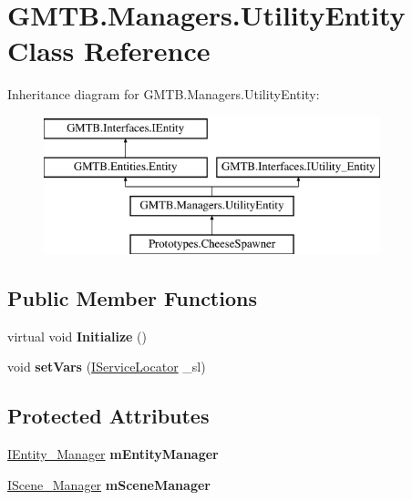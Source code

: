 \hypertarget{class_g_m_t_b_1_1_managers_1_1_utility_entity}{}\section{G\+M\+T\+B.\+Managers.\+Utility\+Entity Class Reference}
\label{class_g_m_t_b_1_1_managers_1_1_utility_entity}
Inheritance diagram for G\+M\+T\+B.\+Managers.\+Utility\+Entity\+:\begin{figure}[H]
\begin{center}
\leavevmode
\includegraphics[height=4.000000cm]{class_g_m_t_b_1_1_managers_1_1_utility_entity}
\end{center}
\end{figure}
\subsection*{Public Member Functions}
\begin{DoxyCompactItemize}
\item 
\mbox{\label{class_g_m_t_b_1_1_managers_1_1_utility_entity_a52030f5969f4c792c0757918839c4547}} 
virtual void {\bfseries Initialize} ()
\item 
\mbox{\label{class_g_m_t_b_1_1_managers_1_1_utility_entity_ad6409146d4f5bd0747c29d7abd35208c}} 
void {\bfseries set\+Vars} (\mbox{\hyperlink{interface_g_m_t_b_1_1_interfaces_1_1_i_service_locator}{I\+Service\+Locator}} \+\_\+sl)
\end{DoxyCompactItemize}
\subsection*{Protected Attributes}
\begin{DoxyCompactItemize}
\item 
\mbox{\label{class_g_m_t_b_1_1_managers_1_1_utility_entity_abd8774c96806a1d37692d5710c28cccf}} 
\mbox{\hyperlink{interface_g_m_t_b_1_1_interfaces_1_1_i_entity___manager}{I\+Entity\+\_\+\+Manager}} {\bfseries m\+Entity\+Manager}
\item 
\mbox{\label{class_g_m_t_b_1_1_managers_1_1_utility_entity_a5c39d9f03ac9d429d6bee7e20efaa421}} 
\mbox{\hyperlink{interface_g_m_t_b_1_1_interfaces_1_1_i_scene___manager}{I\+Scene\+\_\+\+Manager}} {\bfseries m\+Scene\+Manager}
\end{DoxyCompactItemize}
